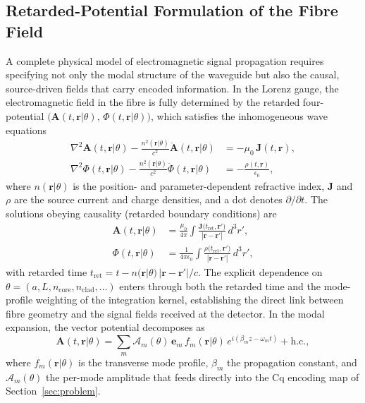 \documentclass[journal,twocolumn]{IEEEtran}
\theoremstyle{definition}
\theoremstyle{plain}
\begin{document}
\subsection{Retarded-Potential Formulation of the Fibre Field}
\label{subsec:retarded}

A complete physical model of electromagnetic signal propagation
requires specifying not only the modal structure of the waveguide
but also the causal, source-driven fields that carry encoded
information.  In the Lorenz gauge, the electromagnetic field in
the fibre is fully determined by the retarded four-potential
$\bigl(\mathbf{A}(t,\mathbf{r}|\theta),\,\Phi(t,\mathbf{r}|\theta)\bigr)$,
which satisfies the inhomogeneous wave equations
\begin{align}
  \nabla^2 \mathbf{A}(t,\mathbf{r}|\theta)
    - \frac{n^2(\mathbf{r}|\theta)}{c^2}
      \ddot{\mathbf{A}}(t,\mathbf{r}|\theta)
  &= -\mu_0\,\mathbf{J}(t,\mathbf{r}), \label{eq:wave_A}\\
  \nabla^2 \Phi(t,\mathbf{r}|\theta)
    - \frac{n^2(\mathbf{r}|\theta)}{c^2}
      \ddot{\Phi}(t,\mathbf{r}|\theta)
  &= -\frac{\rho(t,\mathbf{r})}{\epsilon_0},  \label{eq:wave_Phi}
\end{align}
where $n(\mathbf{r}|\theta)$ is the position- and parameter-dependent
refractive index, $\mathbf{J}$ and $\rho$ are the source current
and charge densities, and a dot denotes $\partial/\partial t$.  The
solutions obeying causality (retarded boundary conditions) are
\begin{align}
  \mathbf{A}(t,\mathbf{r}|\theta) &= \frac{\mu_0}{4\pi}
    \int \frac{\mathbf{J}\bigl(t_{\mathrm{ret}},\mathbf{r}'\bigr)}
         {|\mathbf{r}-\mathbf{r}'|}\,d^3r',
    \label{eq:retarded_A}\\
  \Phi(t,\mathbf{r}|\theta) &= \frac{1}{4\pi\epsilon_0}
    \int \frac{\rho\bigl(t_{\mathrm{ret}},\mathbf{r}'\bigr)}
         {|\mathbf{r}-\mathbf{r}'|}\,d^3r',
    \label{eq:retarded_Phi}
\end{align}
with retarded time $t_{\mathrm{ret}} = t - n(\mathbf{r}|\theta)\,
|\mathbf{r}-\mathbf{r}'|/c$.  The explicit dependence on $\theta =
(a, L, n_{\mathrm{core}}, n_{\mathrm{clad}}, \ldots)$ enters
through both the retarded time and the mode-profile weighting of
the integration kernel, establishing the direct link between fibre
geometry and the signal fields received at the detector.  In the
modal expansion, the vector potential decomposes as
\begin{equation}
  \mathbf{A}(t,\mathbf{r}|\theta)
  = \sum_m \mathcal{A}_m(\theta)\,
    \mathbf{e}_m\,f_m(\mathbf{r}|\theta)\,
    e^{i(\beta_m z - \omega_m t)} + \mathrm{h.c.},
  \label{eq:modal_expansion}
\end{equation}
where $f_m(\mathbf{r}|\theta)$ is the transverse mode profile,
$\beta_m$ the propagation constant, and $\mathcal{A}_m(\theta)$
the per-mode amplitude that feeds directly into the Cq encoding
map of Section~\ref{sec:problem}.
\end{document}
